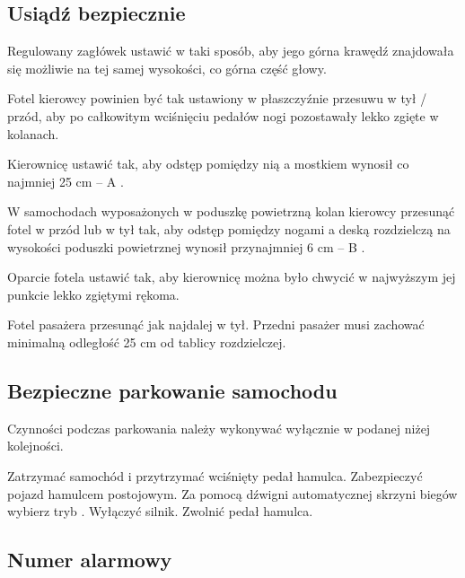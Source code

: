 \subsection{Usiądź bezpiecznie}

Regulowany zagłówek ustawić w taki sposób, aby jego górna krawędź znajdowała się możliwie na tej samej wysokości, co górna część głowy.

Fotel kierowcy powinien być tak ustawiony w płaszczyźnie przesuwu w tył / przód, aby po całkowitym wciśnięciu pedałów nogi pozostawały lekko zgięte w kolanach.
\begin{itemizeArrow}
	\itemArrow Kierownicę ustawić tak, aby odstęp pomiędzy nią a mostkiem wynosił co najmniej 25 cm – A .
\end{itemizeArrow}

W samochodach wyposażonych w poduszkę powietrzną kolan kierowcy przesunąć fotel w przód lub w tył tak, aby odstęp pomiędzy nogami a deską rozdzielczą na wysokości poduszki powietrznej wynosił przynajmniej 6 cm – B .

Oparcie fotela ustawić tak, aby kierownicę można było chwycić w najwyższym jej punkcie lekko zgiętymi rękoma.

\begin{itemizeArrow}
	\itemArrow Fotel pasażera przesunąć jak najdalej w tył. Przedni pasażer musi zachować minimalną odległość 25 cm od tablicy rozdzielczej.
\end{itemizeArrow}

\subsection{Bezpieczne parkowanie samochodu}

Czynności podczas parkowania należy wykonywać wyłącznie w podanej niżej kolejności.

\begin{itemizeArrow}
	\itemArrow Zatrzymać samochód i przytrzymać wciśnięty pedał hamulca.
	\itemArrow Zabezpieczyć pojazd hamulcem postojowym.
	\itemArrow Za pomocą dźwigni automatycznej skrzyni biegów wybierz tryb \gearP.
	\itemArrow Wyłączyć silnik.
	\itemArrow Zwolnić pedał hamulca.
\end{itemizeArrow}

\subsection{Numer alarmowy}


